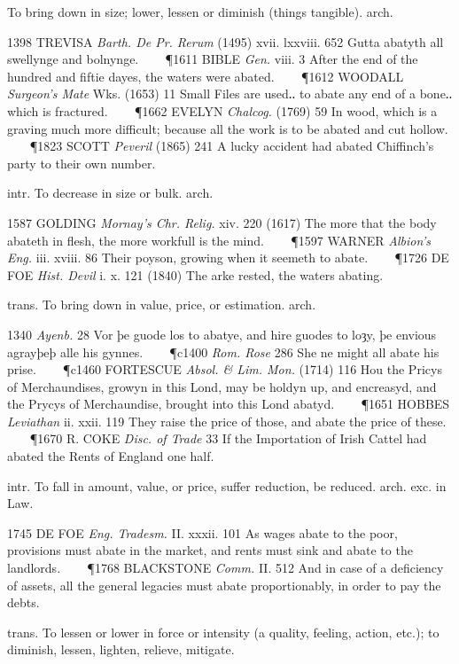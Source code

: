 \begin{description}[wide, labelwidth=!, labelindent=0pt]
\begin{myenumerate}
 To bring down in size; lower, lessen or diminish (things 
tangible). arch. 

1398 TREVISA \textit{Barth. De Pr. Rerum} (1495) xvii. lxxviii. 652 Gutta 
abatyth all swellynge and bolnynge.    
\P 1611 BIBLE \textit{Gen.} viii. 3 After the end of the hundred and fiftie 
dayes, the waters were abated.    
\P 1612 WOODALL \textit{Surgeon's Mate} Wks. (1653) 11 Small Files are used‥
to abate any end of a bone‥which is fractured.    
\P 1662 EVELYN \textit{Chalcog.} (1769) 59 In wood, which is a graving much 
more difficult; because all the work is to be abated and cut hollow.    
\P 1823 SCOTT \textit{Peveril} (1865) 241 A lucky accident had abated 
Chiffinch's party to their own number.

 intr. To decrease in size or bulk. arch. 

1587 GOLDING \textit{Mornay's Chr. Relig.} xiv. 220 (1617) The more that the 
body abateth in flesh, the more workfull is the mind.    
\P 1597 WARNER \textit{Albion's Eng.} iii. xviii. 86 Their poyson, growing 
when it seemeth to abate.    
\P 1726 DE FOE \textit{Hist. Devil} i. x. 121 (1840) The arke rested, the 
waters abating.

 trans. To bring down in value, price, or estimation. arch. 

1340 \textit{Ayenb.} 28 Vor þe guode los to abatye, and hire guodes to loȝy, 
þe envious agrayþeþ alle his gynnes.    
\P c1400 \textit{Rom. Rose} 286 She ne might all abate his prise.    
\P c1460 FORTESCUE \textit{Absol. \& Lim. Mon.} (1714) 116 Hou the Pricys 
of Merchaundises, growyn in this Lond, may be holdyn up, and encreasyd, and the 
Prycys of Merchaundise, brought into this Lond abatyd.    
\P 1651 HOBBES \textit{Leviathan} ii. xxii. 119 They raise the price of those, 
and abate the price of these.    
\P 1670 R. COKE \textit{Disc. of Trade} 33 If the Importation of Irish Cattel 
had abated the Rents of England one half.

 intr. To fall in amount, value, or price, suffer reduction, be 
reduced. arch. exc. in Law. 

1745 DE FOE \textit{Eng. Tradesm.} II. xxxii. 101 As wages abate to the poor, 
provisions must abate in the market, and rents must sink and abate to the 
landlords.    
\P 1768 BLACKSTONE \textit{Comm.} II. 512 And in case of a deficiency of 
assets, all the general legacies must abate proportionably, in order to pay 
the debts.

 trans. To lessen or lower in force or intensity (a quality, 
feeling, action, etc.); to diminish, lessen, lighten, relieve, mitigate. 


\end{myenumerate}
\end{description}
